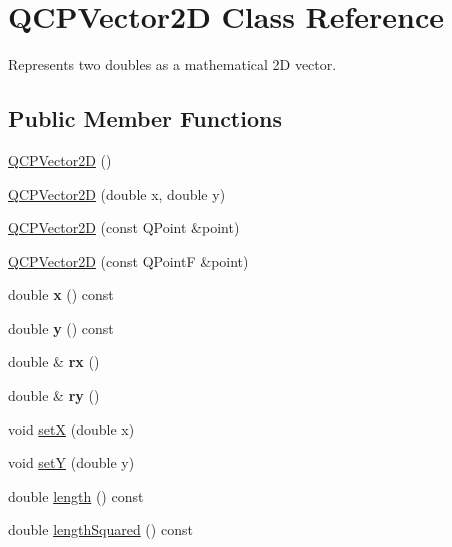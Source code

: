 \hypertarget{classQCPVector2D}{}\section{Q\+C\+P\+Vector2D Class Reference}
\label{classQCPVector2D}


Represents two doubles as a mathematical 2D vector.  


\subsection*{Public Member Functions}
\begin{DoxyCompactItemize}
\item 
\hyperlink{classQCPVector2D_a04c90748c3623044c79fa20788ffbcc6}{Q\+C\+P\+Vector2D} ()
\item 
\hyperlink{classQCPVector2D_a47bd86cebc5588dad6ec84349d9098d4}{Q\+C\+P\+Vector2D} (double x, double y)
\item 
\hyperlink{classQCPVector2D_ad8f30a064dc37c90a7ba5e6732ceb5bb}{Q\+C\+P\+Vector2D} (const Q\+Point \&point)
\item 
\hyperlink{classQCPVector2D_a3c16eba1006c210ffc3299253fef2339}{Q\+C\+P\+Vector2D} (const Q\+PointF \&point)
\item 
\mbox{\label{classQCPVector2D_a4a099e1f9788d52cb46deb8139aa6195}} 
double {\bfseries x} () const
\item 
\mbox{\label{classQCPVector2D_a6398fb643ba380d7961a4b208f4eecf1}} 
double {\bfseries y} () const
\item 
\mbox{\label{classQCPVector2D_a1516252dac9eb5ffb7ddb17fb26e60e0}} 
double \& {\bfseries rx} ()
\item 
\mbox{\label{classQCPVector2D_aa8f59a5b54aec8be8e4d1f39db892fea}} 
double \& {\bfseries ry} ()
\item 
void \hyperlink{classQCPVector2D_ab4249e6ce7bfc37be56f014c54b761ae}{setX} (double x)
\item 
void \hyperlink{classQCPVector2D_ada288019aa8cd51e3b30acfc07b461dc}{setY} (double y)
\item 
double \hyperlink{classQCPVector2D_a10adb5ab031fe94f0b64a3c5aefb552e}{length} () const
\item 
double \hyperlink{classQCPVector2D_a766585459d84cb149334fda1a498b2e5}{length\+Squared} () const

\end{DoxyCompactItemize}
